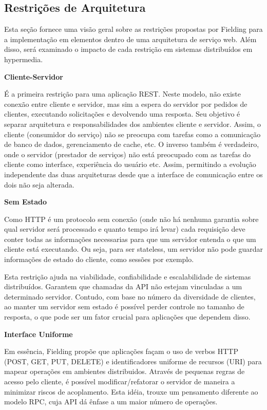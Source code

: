 \subsection[Restrições de Arquitetura]{Restrições de Arquitetura}

Esta seção fornece uma visão geral sobre as restrições propostas por Fielding para a implementação em elementos dentro de uma arquitetura de serviço web. Além disso, será examinado o impacto de cada restrição em sistemas distribuídos em hypermedia.

\textbf{Cliente-Servidor}

É a primeira restrição para uma aplicação REST.  Neste modelo, não existe conexão entre cliente e servidor, mas sim a espera do servidor por pedidos de clientes, executando solicitações e devolvendo uma resposta. Seu objetivo é separar arquitetura e responsabilidades dos ambientes cliente e servidor. Assim, o cliente (consumidor do serviço) não se preocupa com tarefas como a comunicação de banco de dados, gerenciamento de cache, etc. O inverso também é verdadeiro, onde o servidor (prestador de serviços) não está preocupado com as tarefas do cliente como interface, experiência do usuário etc. Assim, permitindo a evolução independente das duas arquiteturas desde que a interface de comunicação entre os dois não seja alterada. \cite{Fielding2000}

\textbf{Sem Estado}

Como HTTP é um protocolo sem conexão (onde não há nenhuma garantia sobre qual servidor será processado e quanto tempo irá levar) cada requisição deve conter todas as informações necessarias para que um servidor entenda o que um cliente está executando. Ou seja, para ser stateless, um servidor não pode guardar informações de estado do cliente, como sessões por exemplo. \cite{Fielding2000}

Esta restrição ajuda na viabilidade, confiabilidade e escalabilidade de sistemas distribuídos. Garantem que chamadas da API não estejam vinculadas a um determinado servidor. Contudo, com base no número da diversidade de clientes, ao manter um servidor sem estado é possível perder controle no tamanho de resposta, o que pode ser um fator crucial para aplicações que dependem disso. \cite{Wildermuth2015}

\textbf{Interface Uniforme}

Em essência, Fielding propõe que aplicações façam o uso de verbos HTTP (POST, GET, PUT, DELETE) e identificadores uniforme de recursos (URI) para mapear operações em ambientes distribuidos. Através de pequenas regras de acesso pelo cliente, é possível modificar/refatorar o servidor de maneira a minimizar riscos de acoplamento. Esta idéia, trouxe um pensamento diferente ao modelo RPC, cuja API dá ênfase a um maior número de operações. \cite{Fielding2000}

